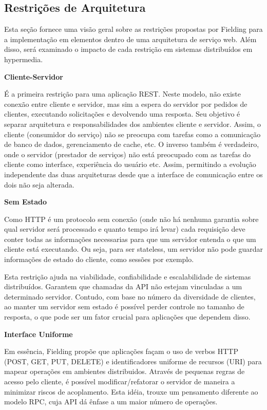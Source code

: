 \subsection[Restrições de Arquitetura]{Restrições de Arquitetura}

Esta seção fornece uma visão geral sobre as restrições propostas por Fielding para a implementação em elementos dentro de uma arquitetura de serviço web. Além disso, será examinado o impacto de cada restrição em sistemas distribuídos em hypermedia.

\textbf{Cliente-Servidor}

É a primeira restrição para uma aplicação REST.  Neste modelo, não existe conexão entre cliente e servidor, mas sim a espera do servidor por pedidos de clientes, executando solicitações e devolvendo uma resposta. Seu objetivo é separar arquitetura e responsabilidades dos ambientes cliente e servidor. Assim, o cliente (consumidor do serviço) não se preocupa com tarefas como a comunicação de banco de dados, gerenciamento de cache, etc. O inverso também é verdadeiro, onde o servidor (prestador de serviços) não está preocupado com as tarefas do cliente como interface, experiência do usuário etc. Assim, permitindo a evolução independente das duas arquiteturas desde que a interface de comunicação entre os dois não seja alterada. \cite{Fielding2000}

\textbf{Sem Estado}

Como HTTP é um protocolo sem conexão (onde não há nenhuma garantia sobre qual servidor será processado e quanto tempo irá levar) cada requisição deve conter todas as informações necessarias para que um servidor entenda o que um cliente está executando. Ou seja, para ser stateless, um servidor não pode guardar informações de estado do cliente, como sessões por exemplo. \cite{Fielding2000}

Esta restrição ajuda na viabilidade, confiabilidade e escalabilidade de sistemas distribuídos. Garantem que chamadas da API não estejam vinculadas a um determinado servidor. Contudo, com base no número da diversidade de clientes, ao manter um servidor sem estado é possível perder controle no tamanho de resposta, o que pode ser um fator crucial para aplicações que dependem disso. \cite{Wildermuth2015}

\textbf{Interface Uniforme}

Em essência, Fielding propõe que aplicações façam o uso de verbos HTTP (POST, GET, PUT, DELETE) e identificadores uniforme de recursos (URI) para mapear operações em ambientes distribuidos. Através de pequenas regras de acesso pelo cliente, é possível modificar/refatorar o servidor de maneira a minimizar riscos de acoplamento. Esta idéia, trouxe um pensamento diferente ao modelo RPC, cuja API dá ênfase a um maior número de operações. \cite{Fielding2000}

